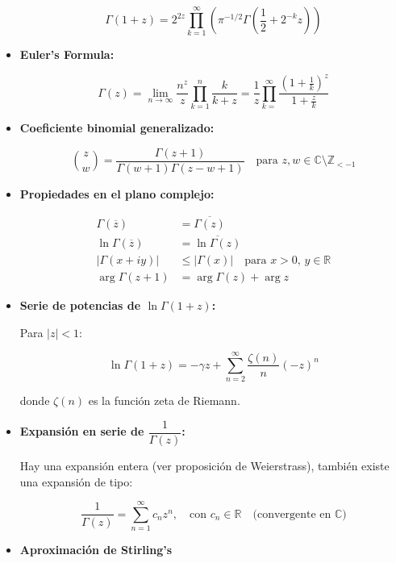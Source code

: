 \begin{itemize}
	      $$
		      \Gamma(1+z)=2^{2z}\prod_{k=1}^{\infty} \left(\pi^{-1/2} \Gamma\left( \dfrac{1}{2}+2^{-k}z \right)  \right)
	      $$

	\item \textbf{Euler's Formula:}

	      $$
		      \Gamma(z)=\lim\limits_{n \to \infty} \dfrac{n^z}{z}\prod_{k=1}^{n} \dfrac{k}{k+z}=\dfrac{1}{z}\prod_{k=}^{\infty}\dfrac{\left(1+\frac{1}{k} \right)^z }{1+\frac{z}{k}}
	      $$

	\item \textbf{Coeficiente binomial generalizado:}

	      \[
		      \binom{z}{w} = \frac{\Gamma(z+1)}{\Gamma(w+1)\Gamma(z-w+1)}
		      \quad \text{para } z, w \in \mathbb{C} \setminus \mathbb{Z}_{< -1}
	      \]

	\item \textbf{Propiedades en el plano complejo:}

	      \begin{align*}
		      \Gamma(\overline{z})     & = \overline{\Gamma(z)}                                        \\
		      \ln \Gamma(\overline{z}) & = \overline{\ln \Gamma(z)}                                    \\
		      |\Gamma(x + i y)|        & \leq |\Gamma(x)| \quad \text{para } x > 0,\, y \in \mathbb{R} \\
		      \arg \Gamma(z+1)         & = \arg \Gamma(z) + \arg z
	      \end{align*}

	\item \textbf{Serie de potencias de \( \ln \Gamma(1+z) \):}

	      Para \( |z| < 1 \):

	      \[
		      \ln \Gamma(1 + z) = -\gamma z + \sum_{n=2}^\infty \frac{\zeta(n)}{n} (-z)^n
	      \]

	      donde \( \zeta(n) \) es la función zeta de Riemann.

	\item \textbf{Expansión en serie de \( \dfrac{1}{\Gamma(z)} \):}

	      Hay una expansión entera (ver proposición de Weierstrass),  también existe una expansión de tipo:

	      \[
		      \frac{1}{\Gamma(z)} = \sum_{n=1}^\infty c_n z^n, \quad \text{con } c_n \in \mathbb{R}
		      \quad \text{(convergente en } \mathbb{C})
	      \]

	\item \textbf{Aproximación de Stirling's}



\end{itemize}
